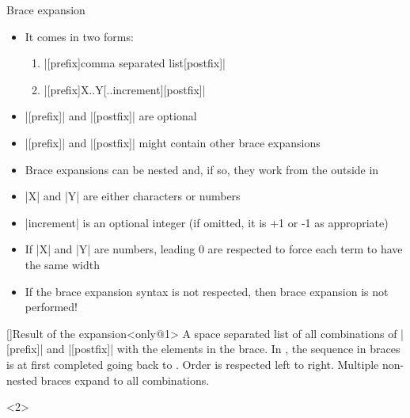 \begin{frame}[fragile]{Brace expansion}
    \vspace{-5mm}
    \begin{overlayarea}{\textwidth}{0.7\textheight}
        \begin{itemize}
            \item It comes in two forms:
                \begin{enumerate}
                    \item \bash|[prefix]{comma separated list}[postfix]|
                    \item \bash|[prefix]{X..Y[..increment]}[postfix]|
                \end{enumerate}
            \item<only@1> \bash|[prefix]| and \bash|[postfix]| are optional 
            \item<only@1> \bash|[prefix]| and \bash|[postfix]| might contain other brace expansions
            \item<only@1> Brace expansions can be nested and, if so, they work from the outside in
            \item<only@1> \bash|X| and \bash|Y| are either characters or numbers
            \item<only@1> \bash|increment| is an optional integer (if omitted, it is +1 or -1 as appropriate)
            \item<only@1> If \bash|X| and \bash|Y| are numbers, leading 0 are respected to force each term to have the same width
            \item<only@1> If the brace expansion syntax is not respected, then brace expansion is not performed!
        \end{itemize}
        \vspace{-3mm}
        \begin{varblock}{}[\textwidth]{Result of the expansion}<only@1>
            A space separated list of all combinations of \bash|[prefix]| and \bash|[postfix]| with the elements in the brace.
            In , the sequence in braces is at first completed going back to .
            Order is respected left to right. Multiple non-nested braces expand to all combinations.
        \end{varblock}
        \begin{onlyenv}<2>
            \begin{lstlisting}[style=MyBash, style=oddnumbers, aboveskip=3mm]

\end{lstlisting}
\end{onlyenv}
\end{overlayarea}
\end{frame}
